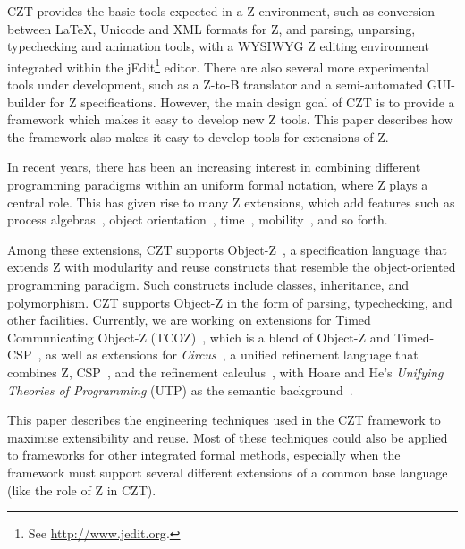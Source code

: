 \documentclass{llncs}
\newcommand{\Circus}{{\sf\slshape Circus}}
\begin{document}
  CZT provides the basic tools expected in a Z environment, such as
  conversion between \LaTeX, Unicode and XML formats for Z, and
  parsing, unparsing, typechecking and animation tools, with a WYSIWYG
  Z editing environment integrated within the 
  jEdit\footnote{See \url{http://www.jedit.org}.} editor.
  There are also several more experimental tools under development,
  such as a Z-to-B translator and a semi-automated GUI-builder for
  Z specifications.  However, the main design goal of CZT is to
  provide a framework which makes it easy to develop new Z tools.
  This paper describes how the framework also makes it easy to develop
  tools for extensions of Z.

  In recent years, there has been an increasing interest in combining
  different programming paradigms within an uniform formal notation,
  where Z plays a central role. This has given rise to many Z
  extensions, which add features such as
  process algebras~\cite{fischer-1998,fischer-2000,circus.sem:intro}, 
  object orientation~\cite{oz,ohcircus},
  time~\cite{tcoz,circus.sem:real.time2},
  mobility~\cite{circus.sem:mobility}, and so forth.

  Among these extensions, CZT supports Object-Z~\cite{oz}, a
  specification language that extends Z with modularity and reuse
  constructs that resemble the object-oriented programming
  paradigm. Such constructs include classes, inheritance, and
  polymorphism. CZT supports Object-Z in the form of parsing,
  typechecking, and other facilities.  Currently, we are working on
  extensions for Timed Communicating Object-Z (TCOZ)~\cite{tcoz},
  which is a blend of Object-Z and Timed-CSP~\cite{timed-csp}, as well
  as extensions for \Circus~\cite{circus.sem:intro}, a unified
  refinement language that combines Z, CSP~\cite{csp.books:roscoe},
  and the refinement calculus~\cite{fm.ref:morgan}, with Hoare and
  He's \textit{Unifying Theories of Programming} (UTP) as the semantic
  background~\cite{hoare.utp}.

  This paper describes the engineering techniques used in the CZT framework
  to maximise extensibility and reuse.
  Most of these techniques could also be applied to frameworks
  for other integrated formal methods, especially when the
  framework must support several different extensions of a common
  base language (like the role of Z in CZT).
\end{document}
